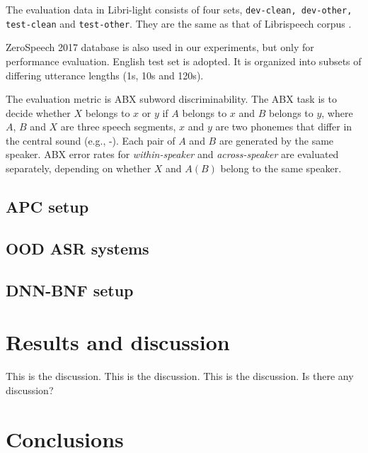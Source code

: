 \documentclass[a4paper]{article}
\begin{document}
The evaluation data in Libri-light consists of four sets, \texttt{dev-clean, dev-other, test-clean} and \texttt{test-other}. They are the same as that of Librispeech corpus \cite{panayotov2015librispeech}.


ZeroSpeech 2017 database is also used in our experiments, but only for performance evaluation.  English test set is adopted. 
It is organized into subsets of differing utterance lengths (1s, 10s and 120s).


The evaluation metric is ABX subword discriminability.
The ABX task is to decide whether $X$ belongs to $x$ or $y$ if $A$ belongs to $x$ and $B$ belongs to $y$, where $A$, $B$ and $X$ are three speech segments, $x$ and $y$ are two phonemes that differ in the central sound (e.g., -). 
Each pair of $A$ and $B$ are generated by the same speaker. 
ABX error rates for \textit{within-speaker} and \textit{across-speaker} are evaluated separately, depending on whether $X$ and $A(B)$ belong to the same speaker. 
\subsection{APC setup}
\subsection{OOD ASR systems}
\subsection{DNN-BNF setup}
\section{Results and discussion}

This is the discussion. This is the discussion. This is the discussion. Is there any discussion?


\section{Conclusions}
\end{document}
